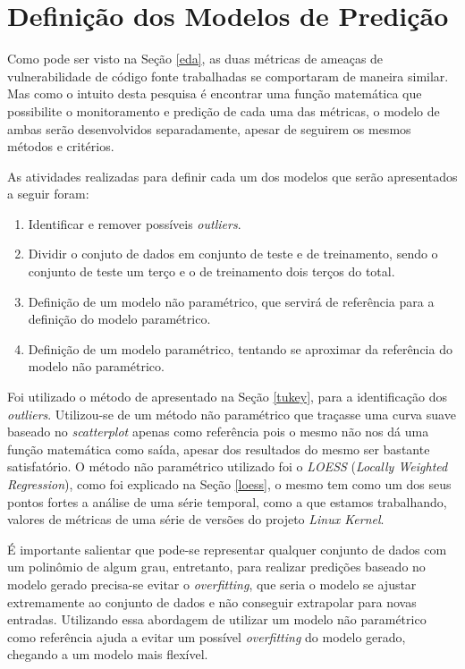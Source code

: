 \chapter{Definição dos Modelos de Predição}\label{definicaomodelos}

Como pode ser visto na Seção \ref{eda}, as duas métricas de ameaças de
vulnerabilidade de código fonte trabalhadas se comportaram de maneira similar.
Mas como o intuito desta pesquisa é encontrar uma função matemática que
possibilite o monitoramento e predição de cada uma das métricas, o modelo de
ambas serão desenvolvidos separadamente, apesar de seguirem os mesmos métodos e
critérios.

As atividades realizadas para definir cada um dos modelos que serão apresentados a
seguir foram:

\begin{enumerate}
 \item Identificar e remover possíveis \textit{outliers}.
 \item Dividir o conjuto de dados em conjunto de teste e de treinamento, sendo o
  conjunto de teste um terço e o de treinamento dois terços do total.
 \item Definição de um modelo não paramétrico, que servirá de referência para a
  definição do modelo paramétrico.
 \item Definição de um modelo paramétrico, tentando se aproximar da referência
  do modelo não paramétrico.
\end{enumerate}

Foi utilizado o método de  apresentado na Seção
\ref{tukey}, para a identificação dos \textit{outliers}. Utilizou-se de um
método não paramétrico que traçasse uma curva suave baseado no
\textit{scatterplot} apenas como referência pois o mesmo não nos dá uma função
matemática como saída, apesar dos resultados do mesmo ser bastante satisfatório.
O método não paramétrico utilizado foi o \textit{LOESS} (\textit{Locally
 Weighted Regression}), como foi explicado na Seção \ref{loess}, o mesmo tem
 como um dos seus pontos fortes a análise de uma série temporal, como a que
 estamos trabalhando, valores de métricas de uma série de versões do projeto
 \textit{Linux Kernel}.
 
 É importante salientar que pode-se representar qualquer conjunto de dados com
 um polinômio de algum grau, entretanto, para realizar predições baseado no
 modelo gerado precisa-se evitar o \textit{overfitting}, que seria o modelo se
 ajustar extremamente ao conjunto de dados e não conseguir extrapolar para novas
 entradas. Utilizando essa abordagem de utilizar um modelo não paramétrico como
 referência ajuda a evitar um possível \textit{overfitting} do modelo gerado,
 chegando a um modelo mais flexível.

